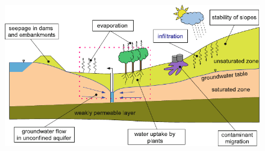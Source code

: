 \begin{frame}
	\frametitle{\subsecname}
	\begin{figure}[ht!]
		\centering
		\includegraphics[height=7cm]{contamination}
	\end{figure}
\end{frame}
